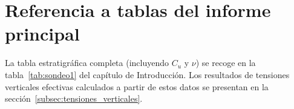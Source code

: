 \section*{Referencia a tablas del informe principal}

La tabla estratigráfica completa (incluyendo $C_u$ y $\nu$) se recoge en la
tabla~\ref{tab:sondeo1} del capítulo de Introducción.
Los resultados de tensiones verticales efectivas calculados a partir de estos
datos se presentan en la sección~\ref{subsec:tensiones_verticales}.
